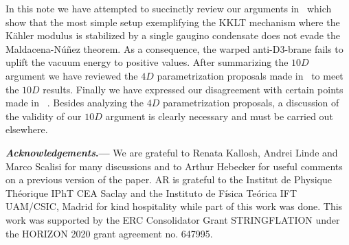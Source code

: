 \documentclass[aps,prd,amsmath,amsfonts,a4paper,11pt,reprint,twocolumn,square,numbers,showpacs,superscriptaddress,floatfix,sort&compress,nofootinbib]{revtex4-1}
\newcommand{\para}[1]{\par\vspace{2mm}\noindent\textbf{\emph{{#1}}.---}}
\begin{document}
In this note we have attempted to succinctly review our arguments in~\cite{Moritz:2017xto} which show that the most simple setup exemplifying the KKLT mechanism where the K\"{a}hler modulus is stabilized by a single gaugino condensate does not evade the Maldacena-N\'{u}\~{n}ez theorem. As a consequence, the warped anti-D3-brane fails to uplift the vacuum energy to positive values. After summarizing the $10D$ argument we have reviewed the $4D$ parametrization proposals made in~\cite{Moritz:2017xto} to meet the $10D$ results. Finally we have expressed our disagreement with certain points made in ~\cite{Kallosh:2018wme}. Besides analyzing the $4D$ parametrization proposals, a discussion of the validity of our $10D$ argument is clearly necessary and must be carried out elsewhere.

\para{Acknowledgements} We are grateful to  Renata Kallosh, Andrei Linde and Marco Scalisi for many discussions and to Arthur Hebecker for useful comments on a previous version of the paper.  
 AR is grateful to the Institut de Physique Th\'{e}orique IPhT CEA Saclay and the Instituto de F\'{i}sica Te\'{o}rica IFT UAM/CSIC, Madrid for kind hospitality while part of this work was done. This work was supported by the ERC Consolidator Grant STRINGFLATION under the HORIZON 2020 grant agreement no.
647995.  

%



\end{document}

